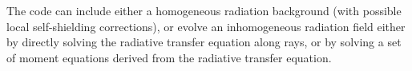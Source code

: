 








The code can include either a homogeneous radiation background (with possible local self-shielding corrections), or evolve an inhomogeneous radiation field either by directly solving the radiative transfer equation along rays, or by solving a set of moment equations derived from the radiative transfer equation.  

